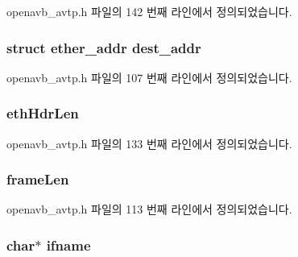openavb\+\_\+avtp.\+h 파일의 142 번째 라인에서 정의되었습니다.

\subsubsection[{\texorpdfstring{dest\+\_\+addr}{dest_addr}}]{\setlength{\rightskip}{0pt plus 5cm}struct ether\+\_\+addr dest\+\_\+addr}\hypertarget{structavtp__stream__t_a339610ccd1360cfca1bafde0e16ef3d1}{}\label{structavtp__stream__t_a339610ccd1360cfca1bafde0e16ef3d1}


openavb\+\_\+avtp.\+h 파일의 107 번째 라인에서 정의되었습니다.

\subsubsection[{\texorpdfstring{eth\+Hdr\+Len}{ethHdrLen}}]{ eth\+Hdr\+Len}\hypertarget{structavtp__stream__t_accd5eff5dfccb78aa19869522125835b}{}\label{structavtp__stream__t_accd5eff5dfccb78aa19869522125835b}


openavb\+\_\+avtp.\+h 파일의 133 번째 라인에서 정의되었습니다.

\subsubsection[{\texorpdfstring{frame\+Len}{frameLen}}]{ frame\+Len}\hypertarget{structavtp__stream__t_a62d47babdcc48dfcfc59166ca8d2c28b}{}\label{structavtp__stream__t_a62d47babdcc48dfcfc59166ca8d2c28b}


openavb\+\_\+avtp.\+h 파일의 113 번째 라인에서 정의되었습니다.

\subsubsection[{\texorpdfstring{ifname}{ifname}}]{\setlength{\rightskip}{0pt plus 5cm}char$\ast$ ifname}\hypertarget{structavtp__stream__t_a57634e15933b3c82405e0bbe1e270d1b}{}\label{structavtp__stream__t_a57634e15933b3c82405e0bbe1e270d1b}


